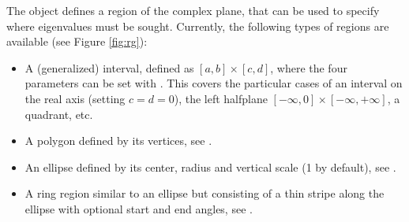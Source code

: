 The  object defines a region of the complex plane, that can be used to specify where eigenvalues must be sought. Currently, the following types of regions are available (see Figure \ref{fig:rg}):
\begin{itemize}
\setlength{\itemsep}{0mm}
\item A (generalized) interval, defined as $[a,b]\times[c,d]$, where the four parameters can be set with . This covers the particular cases of an interval on the real axis (setting $c=d=0$), the left halfplane $[-\infty,0]\times[-\infty,+\infty]$, a quadrant, etc.
\item A polygon defined by its vertices, see .
\item An ellipse defined by its center, radius and vertical scale (1 by default), see .
\item A ring region similar to an ellipse but consisting of a thin stripe along the ellipse with optional start and end angles, see .
\end{itemize}

